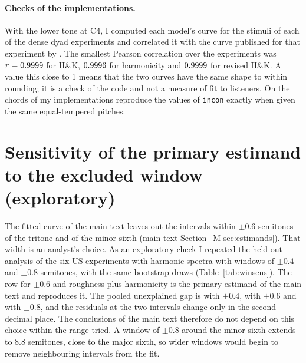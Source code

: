 \documentclass[11pt,a4paper]{article}
\newcommand{\HK}{H\&K}
\begin{document}
\paragraph{Checks of the implementations.}
With the lower tone at C4, I computed each model's curve for the stimuli of each of the
\nValExp{} dense dyad experiments and correlated it with the curve published for that
experiment by \citet{marjieh2024}. The smallest Pearson correlation over the experiments was
$r=0.9999$ for \HK, $0.9996$ for harmonicity and $0.9999$ for revised \HK. A value
this close to 1 means that the two curves have the same shape to within rounding; it is a
check of the code and not a measure of fit to listeners. On the chords of
\citet{bowling2018} my implementations reproduce the values of \texttt{incon} exactly when
given the same equal-tempered pitches.

\section{Sensitivity of the primary estimand to the excluded window (exploratory)}
\label{sec:winsens}
The fitted curve of the main text leaves out the intervals within $\pm0.6$ semitones of the
tritone and of the minor sixth (main-text Section~\ref{M-sec:estimands}). That width is an
analyst's choice. As an exploratory check I
repeated the held-out analysis of the six US experiments with harmonic spectra with windows of
$\pm0.4$ and $\pm0.8$ semitones, with the same bootstrap draws (Table~\ref{tab:winsens}). The
row for $\pm0.6$ and roughness plus harmonicity is the primary estimand of the main text and
reproduces it. The pooled unexplained gap is \winGapFour{} \winGapFourCI{} with $\pm0.4$,
\winGapSix{} \winGapSixCI{} with $\pm0.6$ and \winGapEight{} \winGapEightCI{} with $\pm0.8$,
and the residuals at the two intervals change only in the second decimal place. The conclusions
of the main text therefore do not depend on this choice within the range tried. A window of
$\pm0.8$ around the minor sixth extends to 8.8 semitones, close to the major sixth, so wider
windows would begin to remove neighbouring intervals from the fit.

\begin{table}[h]
\centering
\caption{The held-out residual at the tritone and at the minor sixth, and the unexplained gap,
for three widths of the window excluded from the fit (exploratory). Random-effects pooled
estimates over the six US experiments with harmonic spectra [Hartung--Knapp 95\% interval], SD
units.}
\label{tab:winsens}
\small
{}
\end{table}
\end{document}

